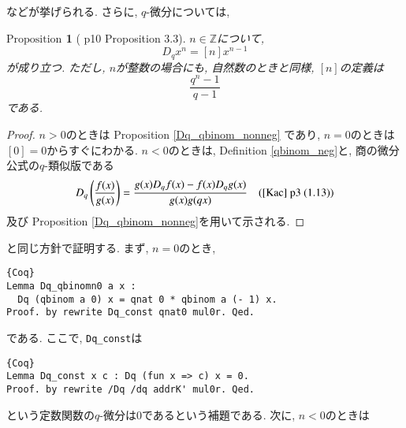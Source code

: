 \documentclass[11pt]{jarticle}
\theoremstyle{mystyle}
\newtheorem{prop}[df]{$\textrm{Proposition}$}
\newcommand{\bprop}{\begin{shadebox} \begin{prop}}
\newcommand{\eprop}{\end{prop} \end{shadebox}}
\newcommand{\bpf}{\begin{proof}}
\newcommand{\epf}{\end{proof}}
\newcommand{\Z}{\mathbb{Z}}
\newcommand{\0}{\textbf{0}}
\newcommand{\1}{\textbf{1}}
\newcommand{\2}{\textbf{2}}
\begin{document}
などが挙げられる. 
さらに, $q$-微分については, 
\bprop[\cite{Kac} p10 Proposition 3.3]
  $n \in \Z$について, 
  \[
    D_q x^n = [n] x ^{n - 1}
  \]
  が成り立つ. ただし, $n$が整数の場合にも, 自然数のときと同様, $[n]$の定義は
  \[
    \frac{q^n - 1}{q - 1}
  \]
  である. 
\eprop
\bpf
  $n > 0$のときは Proposition \ref{Dq_qbinom_nonneg} であり, $n = 0$のときは$[0] = 0$からすぐにわかる. 
  $n < 0$のときは, Definition \ref{qbinom_neg}と, 商の微分公式の$q$-類似版である
  \[
    D_q \left( \frac{f(x)}{g(x)} \right) = \frac{g(x) D_q f(x) - f(x) D_q g(x)}{g(x) g(qx)} \quad
    \text{(\cite{Kac} p3 (1.13))}
  \]
  及び Proposition \ref{Dq_qbinom_nonneg}を用いて示される. 
\epf
\cite{Kac}と同じ方針で証明する. まず, $n = 0$のとき, 
\begin{lstlisting}{Coq}
Lemma Dq_qbinomn0 a x :
  Dq (qbinom a 0) x = qnat 0 * qbinom a (- 1) x.
Proof. by rewrite Dq_const qnat0 mul0r. Qed.
\end{lstlisting}
である. ここで, {\tt Dq\_const}は
\begin{lstlisting}{Coq}
Lemma Dq_const x c : Dq (fun x => c) x = 0.
Proof. by rewrite /Dq /dq addrK' mul0r. Qed.
\end{lstlisting}
という定数関数の$q$-微分は$0$であるという補題である. 次に, $n < 0$のときは
\end{document}
